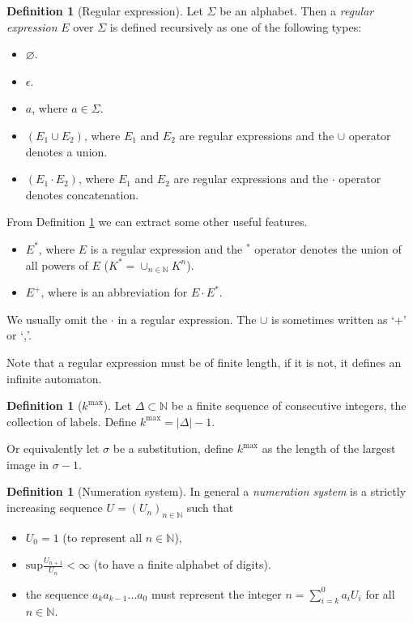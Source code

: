 \documentclass{article}
\theoremstyle{definition}
\newtheorem{definition}[theorem]{Definition}
\begin{document}
\begin{definition}[Regular expression] \label{def:regular_expression}
Let $\Sigma$ be an alphabet. Then a \emph{regular expression} $E$ over $\Sigma$
is defined recursively as one of the following types:
\begin{itemize}
\item $\varnothing$.
\item $\epsilon$.
\item $a$, where $a \in \Sigma$.
\item $(E_1 \cup E_2)$, where $E_1$ and $E_2$ are regular expressions and the
      $\cup$ operator denotes a union.
\item $(E_1 \cdot E_2)$, where $E_1$ and $E_2$ are regular expressions and the
      $\cdot$ operator denotes concatenation.
\end{itemize}
\end{definition}

From Definition \ref{def:regular_expression} we can extract some other useful
features.
\begin{itemize}
\item $E^*$, where $E$ is a regular expression and the $^*$ operator denotes the
      union of all powers of $E$ ($K^* = \cup_{n \in \mathbb{N}}K^n$).
\item $E^+$, where is an abbreviation for $E \cdot E^*$.
\end{itemize}

We usually omit the $\cdot$ in a regular expression. The $\cup$ is sometimes
written as `+' or `,'.

Note that a regular expression must be of finite length, if it is not, it
defines an infinite automaton.

\begin{definition}[$k^\mathrm{max}$] \label{def:k-max}
Let $\Delta \subset \mathbb{N}$ be a finite sequence of consecutive integers, 
the collection of labels. Define $k^\mathrm{max} = |\Delta| - 1$.

Or equivalently let $\sigma$ be a substitution, define $k^\mathrm{max}$ as
the length of the largest image in $\sigma - 1$.
\end{definition}

\begin{definition}[Numeration system] \label{def:numeration_system}
In general a \emph{numeration system} is a strictly increasing sequence 
$U = (U_n)_{n \in \mathbb{N}}$ such that
\begin{itemize}
\item $U_0 = 1$ (to represent all $n \in \mathbb{N}$),
\item $\mathrm{sup}\frac{U_{n + 1}}{U_n} < \infty$ (to have a finite alphabet 
      of digits).
\item the sequence $a_k a_{k - 1} \ldots a_0$ must represent the integer
$n = \sum_{i = k}^0 a_i U_i$ for all $n \in \mathbb{N}$.
\end{itemize}
\end{definition}
\end{document}
